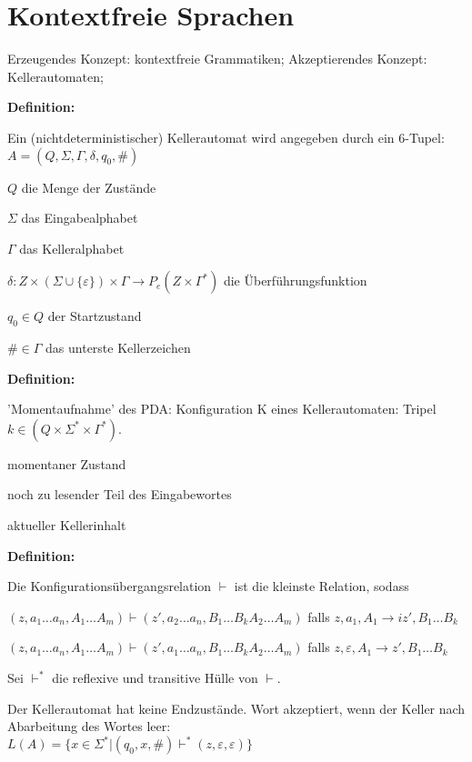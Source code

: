 \documentclass[11pt,
			a4paper,
			parskip=full,
			toc=bib,
			toc=idx,
			toc=listof,
			ngerman
			listof=totoc,]{scrartcl}
\newcommand{\concept}[1]{%
	\sf{%
		\textbf{%
				\textcolor{mymauve}{#1}%
		}%
	}%
	\rm%
}
\newenvironment{objDef}[1]%
{	\begin{framed}
	\textbf{Definition:} \concept{#1}
	\compress}%
{\end{framed}}
\newcommand{\compress}{\vspace{-1em}}
\begin{document}
\section{Kontextfreie Sprachen}
\compress
Erzeugendes Konzept: kontextfreie Grammatiken; Akzeptierendes Konzept: Kellerautomaten; \\
\compress
\begin{objDef}{ (nichtdeterministischer) Kellerautomat}

Ein (nichtdeterministischer) Kellerautomat wird angegeben durch ein 6-Tupel: $A=(Q,Σ,Γ,δ,q_0,\#)$
\compress
\begin{compactitem}
  \item $Q$ die Menge der Zustände 
  \item $Σ$ das Eingabealphabet
  \item $Γ$ das Kelleralphabet
  \item $δ: Z \times (Σ ∪ \{ ε \}) \times Γ → P_e(Z \times Γ^*)$ die Überführungsfunktion
  \item $q_0 \in Q$ der Startzustand
  \item $\# \in Γ$ das unterste Kellerzeichen
\end{compactitem} 

\compress
\begin{objDef}{Konfiguration eines Kellerautomat}

'Momentaufnahme' des PDA: Konfiguration K eines Kellerautomaten: Tripel $k\in(Q \times Σ^* \times Γ^*)$.
\compress
\begin{compactenum}
  \item momentaner Zustand
  \item noch zu lesender Teil des Eingabewortes
  \item aktueller Kellerinhalt
\end{compactenum}
\end{objDef}
\compress
\compress
\begin{objDef}{Konfigurationsübergangsrelation}

Die Konfigurationsübergangsrelation $⊢$ ist die kleinste Relation, sodass
\compress
\begin{compactitem}
  \item $(z,a_1 \dots a_n, A_1 \dots A_m) ⊢ (z', a_2 \dots a_n, B_1 \dots B_kA_2 \dots A_m)$ falls $z,a_1,A_1 →i z',B_1 \dots B_k$
  \item $(z,a_1 \dots a_n, A_1 \dots A_m) ⊢ (z', a_1 \dots a_n, B_1 \dots B_kA_2 \dots A_m)$ falls $z,ε,A_1 → z',B_1 \dots B_k$
\end{compactitem}
\compress
Sei $⊢^*$ die reflexive und transitive Hülle von $⊢$.
\end{objDef}
\compress
\compress
Der Kellerautomat hat keine Endzustände. Wort akzeptiert, wenn der Keller nach Abarbeitung des Wortes leer:\\
$L(A) = \{ x \in Σ^* | (q_0,x,\#) ⊢^* (z,ε,ε) \}$

\end{objDef}
\end{document}
